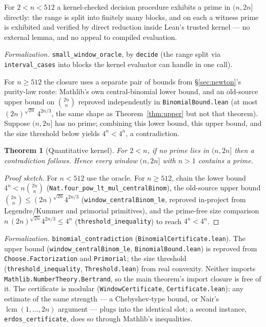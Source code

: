 \documentclass[11pt,a4paper]{amsart}
\theoremstyle{plain}
\newtheorem{theorem}{Theorem}[section]
\theoremstyle{definition}
\theoremstyle{plain}
\theoremstyle{remark}
\newcommand{\lean}[1]{\textup{\texttt{#1}}}
\newcommand{\Formal}[1]{\par\smallskip\noindent\emph{Formalization.} #1\par\smallskip}
\begin{document}
For $2<n<512$ a kernel-checked decision procedure exhibits a prime in $(n,2n]$ directly: the
range is split into finitely many blocks, and on each a witness prime is exhibited and
verified by direct reduction inside Lean's trusted kernel --- no external lemma, and no
appeal to compiled evaluation.

\Formal{\lean{small\_window\_oracle}, by \lean{decide} (the range split via
\lean{interval\_cases} into blocks the kernel evaluator can handle in one call).}

For $n\ge512$ the closure uses a separate pair of bounds from \S\ref{sec:newton}'s
purity-law route: Mathlib's own central-binomial lower bound, and an old-source upper
bound on $\binom{2n}{n}$ reproved independently in \lean{BinomialBound.lean} (at most
$(2n)^{\sqrt{2n}}\,4^{2n/3}$, the same shape as Theorem~\ref{thm:upper} but not that
theorem). Suppose $(n,2n]$ has no prime; combining this lower bound, this upper bound, and
the size threshold below yields $4^n<4^n$, a contradiction.

\begin{theorem}[Quantitative kernel]\label{thm:erdos}
For $2<n$, if no prime lies in $(n,2n]$ then a contradiction follows. Hence every window
$(n,2n]$ with $n>1$ contains a prime.
\end{theorem}

\begin{proof}[Proof sketch]
For $n<512$ use the oracle. For $n\ge512$, chain the lower bound
$4^n<n\binom{2n}{n}$ (\lean{Nat.four\_pow\_lt\_mul\_centralBinom}), the old-source upper
bound $\binom{2n}{n}\le(2n)^{\sqrt{2n}}4^{2n/3}$ (\lean{window\_centralBinom\_le}, reproved
in-project from Legendre/Kummer and primorial primitives), and the prime-free size
comparison $n\,(2n)^{\sqrt{2n}}4^{2n/3}\le4^n$ (\lean{threshold\_inequality}) to reach
$4^n<4^n$.
\end{proof}

\Formal{\lean{binomial\_contradiction} (\lean{BinomialCertificate.lean}). The upper bound
(\lean{window\_centralBinom\_le}, \lean{BinomialBound.lean}) is reproved from
\lean{Choose.Factorization} and \lean{Primorial}; the size threshold
(\lean{threshold\_inequality}, \lean{Threshold.lean}) from real convexity. Neither imports
\lean{Mathlib.NumberTheory.Bertrand}, so the main theorem's import closure is free of it.
The certificate is modular (\lean{WindowCertificate}, \lean{Certificate.lean}): any estimate
of the same strength --- a Chebyshev-type bound, or Nair's $\operatorname{lcm}(1,\dots,2n)$
argument \cite{nair1982} --- plugs into the identical slot; a second instance,
\lean{erdos\_certificate}, does so through Mathlib's inequalities.}
\end{document}
